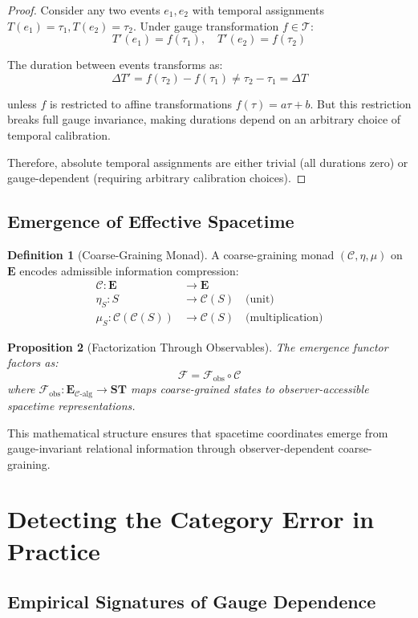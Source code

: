\documentclass[11pt]{article}
\theoremstyle{definition}
\newtheorem{definition}{Definition}[section]
\theoremstyle{plain}
\newtheorem{proposition}[definition]{Proposition}
\theoremstyle{remark}
\newcommand{\Ecat}{\mathbf{E}}
\newcommand{\ST}{\mathbf{ST}}
\newcommand{\F}{\mathcal{F}}
\newcommand{\C}{\mathcal{C}}
\newcommand{\T}{\mathcal{T}}
\begin{document}
\begin{proof}
Consider any two events $e_1, e_2$ with temporal assignments $T(e_1) = \tau_1, T(e_2) = \tau_2$. Under gauge transformation $f \in \T$:
$$T'(e_1) = f(\tau_1), \quad T'(e_2) = f(\tau_2)$$

The duration between events transforms as:
$$\Delta T' = f(\tau_2) - f(\tau_1) \neq \tau_2 - \tau_1 = \Delta T$$

unless $f$ is restricted to affine transformations $f(\tau) = a\tau + b$. But this restriction breaks full gauge invariance, making durations depend on an arbitrary choice of temporal calibration.

Therefore, absolute temporal assignments are either trivial (all durations zero) or gauge-dependent (requiring arbitrary calibration choices).
\end{proof}

\subsection{Emergence of Effective Spacetime}

\begin{definition}[Coarse-Graining Monad]
A coarse-graining monad $(\C, \eta, \mu)$ on $\Ecat$ encodes admissible information compression:
\begin{align}
\C: \Ecat &\to \Ecat\\
\eta_S: S &\to \C(S) \quad \text{(unit)}\\
\mu_S: \C(\C(S)) &\to \C(S) \quad \text{(multiplication)}
\end{align}
\end{definition}

\begin{proposition}[Factorization Through Observables]
The emergence functor factors as:
$$\F = \F_{\text{obs}} \circ \C$$
where $\F_{\text{obs}}: \Ecat_{\C\text{-alg}} \to \ST$ maps coarse-grained states to observer-accessible spacetime representations.
\end{proposition}

This mathematical structure ensures that spacetime coordinates emerge from gauge-invariant relational information through observer-dependent coarse-graining.

\section{Detecting the Category Error in Practice}

\subsection{Empirical Signatures of Gauge Dependence}
\end{document}
